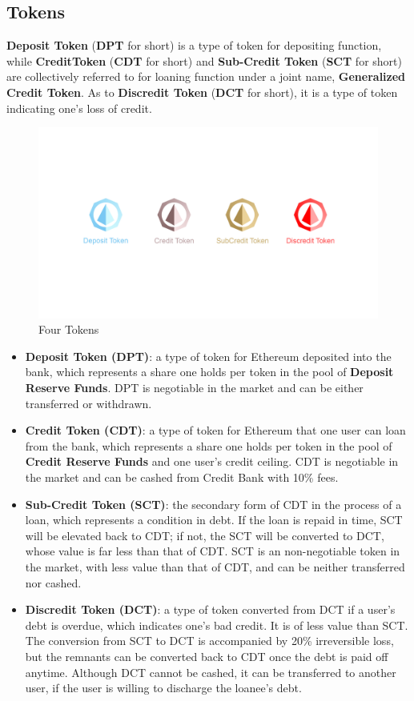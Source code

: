 \documentclass[review]{elsarticle}
\begin{document}
\subsection{Tokens}
\textbf{Deposit Token} (\textbf{DPT} for short) is a type of token for depositing function, while \textbf{CreditToken} (\textbf{CDT} for short) and \textbf{Sub-Credit Token} (\textbf{SCT} for short) are collectively referred to for loaning function under a joint name, \textbf{Generalized Credit Token}. As to \textbf{Discredit Token} (\textbf{DCT} for short), it is a type of token indicating one's loss of credit.

\begin{figure}[H]
\begin{center}
\includegraphics[width=4.5in]{Graphs/logos-line.jpg}
\end{center}
\caption{Four Tokens}\label{FT}
\end{figure}

\begin{itemize} 
   \item \textbf{Deposit Token (DPT)}: a type of token for Ethereum deposited into the bank, which represents a share one holds per token in the pool of \textbf{Deposit Reserve Funds}. DPT is negotiable in the market and can be either transferred or withdrawn.
   \item \textbf{Credit Token (CDT)}: a type of token for Ethereum that one user can loan from the bank, which represents a share one holds per token in the pool of \textbf{Credit Reserve Funds} and one user's credit ceiling. CDT is negotiable in the market and can be cashed from Credit Bank with 10\% fees.
   \item \textbf{Sub-Credit Token (SCT)}: the secondary form of CDT in the process of a loan, which represents a condition in debt. If the loan is repaid in time, SCT will be elevated back to CDT; if not, the SCT will be converted to DCT, whose value is far less than that of CDT. SCT is an non-negotiable token in the market, with less value than that of CDT, and can be neither transferred nor cashed.
   \item \textbf{Discredit Token (DCT)}: a type of token converted from DCT if a user's debt is overdue, which indicates one's bad credit. It is of less value than SCT. The conversion from SCT to DCT is accompanied by 20\% irreversible loss, but the remnants can be converted back to CDT once the debt is paid off anytime. Although DCT cannot be cashed, it can be transferred to another user, if the user is willing to discharge the loanee's debt.
\end{itemize}
\end{document}
